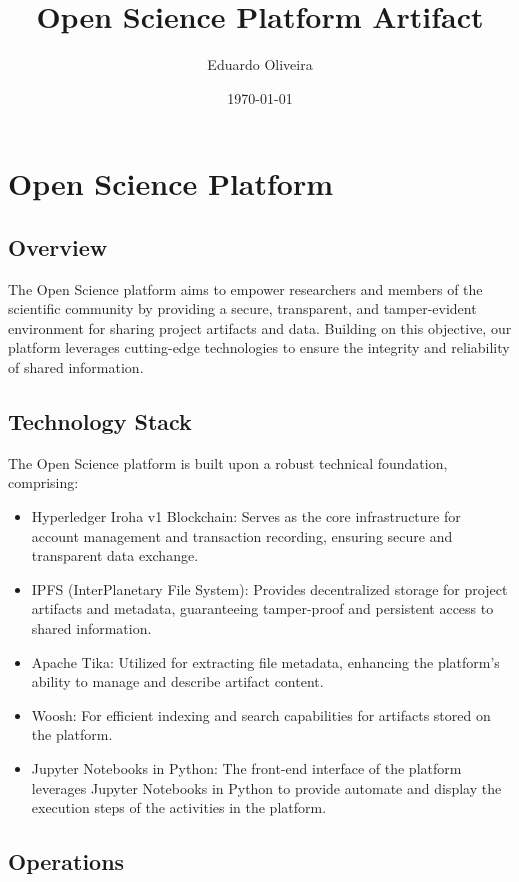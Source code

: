 \documentclass{article}
\title{Open Science Platform Artifact}
\author{Eduardo Oliveira}
\date{\today}
\begin{document}
\maketitle

\section{Open Science Platform}

\subsection{Overview}

The Open Science platform aims to empower researchers and members of the scientific community by providing a secure, transparent, and tamper-evident environment for sharing project artifacts and data. Building on this objective, our platform leverages cutting-edge technologies to ensure the integrity and reliability of shared information.

\subsection{Technology Stack}

The Open Science platform is built upon a robust technical foundation, comprising:

\begin{itemize}
  \item Hyperledger Iroha v1 Blockchain: Serves as the core infrastructure for account management and transaction recording, ensuring secure and transparent data exchange.
  \item IPFS (InterPlanetary File System): Provides decentralized storage for project artifacts and metadata, guaranteeing tamper-proof and persistent access to shared information.
  \item Apache Tika: Utilized for extracting file metadata, enhancing the platform's ability to manage and describe artifact content.
  \item Woosh: For efficient indexing and search capabilities for artifacts stored on the platform.
  \item Jupyter Notebooks in Python: The front-end interface of the platform leverages Jupyter Notebooks in Python to provide automate and display the execution steps of the activities in the platform.
\end{itemize}

\subsection{Operations}
\end{document}
